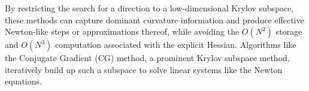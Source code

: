 By restricting the search for a direction to a low-dimensional Krylov subspace, these methods can capture dominant curvature information and produce effective Newton-like steps or approximations thereof, while avoiding the $O(N^2)$ storage and $O(N^3)$ computation associated with the explicit Hessian. Algorithms like the Conjugate Gradient (CG) method, a prominent Krylov subspace method, iteratively build up such a subspace to solve linear systems like the Newton equations.

